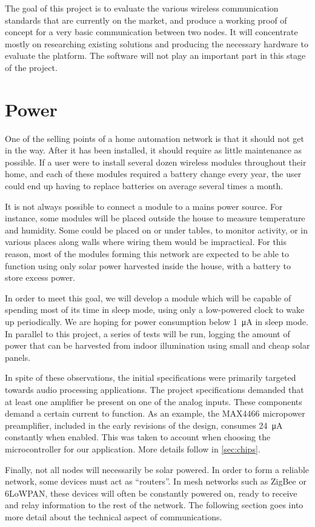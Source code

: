 The goal of this project is to evaluate the various wireless communication
standards that are currently on the market, and produce a working proof of
concept for a very basic communication between two nodes. It will concentrate
mostly on researching existing solutions and producing the necessary hardware to
evaluate the platform. The software will not play an important part in this
stage of the project.

\section{Power}\label{sec:power}

One of the selling points of a home automation network is that it should not get
in the way. After it has been installed, it should require as little maintenance
as possible. If a user were to install several dozen wireless modules throughout
their home, and each of these modules required a battery change every year, the
user could end up having to replace batteries on average several times a month. 

It is not always possible to connect a module to a mains power source. For
instance, some modules will be placed outside the house to measure temperature
and humidity. Some could be placed on or under tables, to monitor activity, or
in various places along walls where wiring them would be impractical. For this
reason, most of the modules forming this network are expected to be able to
function using only solar power harvested inside the house, with a battery to
store excess power.

In order to meet this goal, we will develop a module which will be capable of
spending most of its time in sleep mode, using only a low-powered clock to wake
up periodically. We are hoping for power consumption below
\SI{1}{\micro\ampere} in sleep mode. In parallel to this project, a series of
tests will be run, logging the amount of power that can be harvested from indoor
illumination using small and cheap solar panels.

In spite of these observations, the initial specifications were primarily
targeted towards audio processing applications. The project specifications
demanded that at least one amplifier be present on one of the analog inputs.
These components demand a certain current to function. As an example, the
MAX4466 micropower preamplifier, included in the early revisions of the design,
consumes \SI{24}{\micro\ampere} constantly when enabled. This was taken to
account when choosing the microcontroller for our application. More details
follow in \autoref{sec:chips}.

Finally, not all nodes will necessarily be solar powered. In order to form
a reliable network, some devices must act as ``routers''. In mesh networks such
as ZigBee or \ac{6LoWPAN}, these devices will often be constantly powered on,
ready to receive and relay information to the rest of the network. The following
section goes into more detail about the technical aspect of communications.


